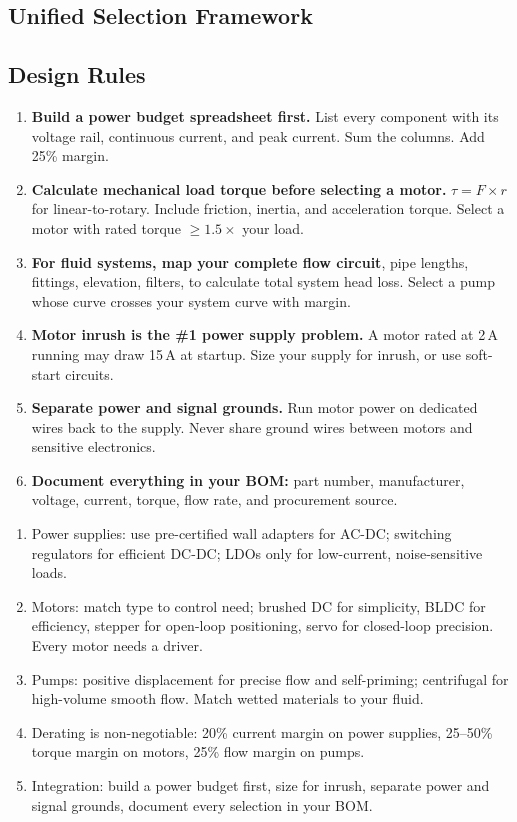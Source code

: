 \subsection{Unified Selection Framework}



\subsection{Design Rules}

\begin{enumerate}[leftmargin=1.5em]
  \item \textbf{Build a power budget spreadsheet first.} List every component with its voltage rail, continuous current, and peak current. Sum the columns. Add 25\% margin.
  \item \textbf{Calculate mechanical load torque before selecting a motor.} $\tau = F \times r$ for linear-to-rotary. Include friction, inertia, and acceleration torque. Select a motor with rated torque $\geq 1.5\times$ your load.
  \item \textbf{For fluid systems, map your complete flow circuit}, pipe lengths, fittings, elevation, filters, to calculate total system head loss. Select a pump whose curve crosses your system curve with margin.
  \item \textbf{Motor inrush is the \#1 power supply problem.} A motor rated at 2\,A running may draw 15\,A at startup. Size your supply for inrush, or use soft-start circuits.
  \item \textbf{Separate power and signal grounds.} Run motor power on dedicated wires back to the supply. Never share ground wires between motors and sensitive electronics.
  \item \textbf{Document everything in your BOM:} part number, manufacturer, voltage, current, torque, flow rate, and procurement source.
\end{enumerate}

\begin{keyconceptbox}
\begin{enumerate}[nosep,leftmargin=1.5em]
  \item Power supplies: use pre-certified wall adapters for AC-DC; switching regulators for efficient DC-DC; LDOs only for low-current, noise-sensitive loads.
  \item Motors: match type to control need; brushed DC for simplicity, BLDC for efficiency, stepper for open-loop positioning, servo for closed-loop precision. Every motor needs a driver.
  \item Pumps: positive displacement for precise flow and self-priming; centrifugal for high-volume smooth flow. Match wetted materials to your fluid.
  \item Derating is non-negotiable: 20\% current margin on power supplies, 25--50\% torque margin on motors, 25\% flow margin on pumps.
  \item Integration: build a power budget first, size for inrush, separate power and signal grounds, document every selection in your BOM.
\end{enumerate}
\end{keyconceptbox}


